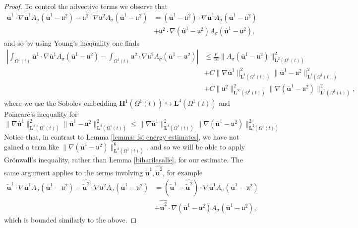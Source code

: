 \documentclass[a4paper]{amsart}
\numberwithin{equation}{section}
\newcommand{\grad}{\nabla}
\theoremstyle{plain}
\newcommand{\mbf}[1]{\mathbf{#1}}
\newcommand{\utwo}{\boldsymbol{\mathfrak{u}}^2}
\begin{document}
\begin{proof}
To control the advective terms we observe that
\begin{align*}
\overline{\mbf{u}}^1 \cdot \grad\overline{\mbf{u}}^1 A_{\sigma}(\overline{\mbf{u}}^1 - \utwo) - \utwo \cdot \grad \utwo A_{\sigma}(\overline{\mbf{u}}^1 - \utwo) &= (\overline{\mbf{u}}^1 - \utwo) \cdot \grad\overline{\mbf{u}}^1 A_{\sigma}(\overline{\mbf{u}}^1 - \utwo)\\
&+ \utwo \cdot \grad (\overline{\mbf{u}}^1 - \utwo) A_{\sigma}(\overline{\mbf{u}}^1 - \utwo),
\end{align*}
and so by using Young's inequality one finds
\begin{align*}
    \left| \int_{\Omega^1(t)} \overline{\mbf{u}}^1 \cdot \grad\overline{\mbf{u}}^1 A_{\sigma}(\overline{\mbf{u}}^1 - \utwo) -  \int_{\Omega^1(t)} \utwo \cdot \grad \utwo A_{\sigma}(\overline{\mbf{u}}^1 - \utwo)\right| &\leq \frac{\mu}{16} \|A_{\sigma}(\overline{\mbf{u}}^1 - \utwo)\|_{\mbf{L}^2(\Omega^1(t))}^2\\
    &+ C \|\grad \overline{\mbf{u}}^1\|_{\mbf{L}^4(\Omega^1(t))}^2 \|\overline{\mbf{u}}^1 - \utwo\|_{\mbf{L}^4(\Omega^1(t))}^2\\
    &+ C\|\utwo\|_{\mbf{L}^\infty(\Omega^1(t))}^2 \|\grad(\overline{\mbf{u}}^1 - \utwo)\|_{\mbf{L}^2(\Omega^1(t))}^2,
\end{align*}
where we use the Sobolev embedding $\mbf{H}^1(\Omega^1(t)) \hookrightarrow \mbf{L}^4(\Omega^1(t))$ and Poincar\'e's inequality for
\[ \|\grad \overline{\mbf{u}}^1\|_{\mbf{L}^4(\Omega^1(t))}^2 \|\overline{\mbf{u}}^1 - \utwo\|_{\mbf{L}^4(\Omega^1(t))}^2 \leq \|\grad \overline{\mbf{u}}^1\|_{\mbf{L}^4(\Omega^1(t))}^2 \|\grad(\overline{\mbf{u}}^1 - \utwo)\|_{\mbf{L}^2(\Omega^1(t))}^2 \]
Notice that, in contrast to Lemma \ref{lemma: fsi energy estimates}, we have not gained a term like $\|\grad(\overline{\mbf{u}}^1 - \utwo)\|_{\mbf{L}^2(\Omega^1(t))}^6$, and so we will be able to apply Gr\"onwall's inequality, rather than Lemma \ref{biharilasalle}, for our estimate.
The same argument applies to the terms involving $\widetilde{\mbf{u}}^1, \widehat{\widetilde{\mbf{u}}^2}$, for example
\begin{align*}
    \widetilde{\mbf{u}}^1 \cdot \grad \overline{\mbf{u}}^1 A_{\sigma}(\overline{\mbf{u}}^1 - \utwo) -\widehat{\widetilde{\mbf{u}}^2} \cdot \grad \utwo A_{\sigma}(\overline{\mbf{u}}^1 - \utwo) &= (\widetilde{\mbf{u}}^1 - \widehat{\widetilde{\mbf{u}}^2}) \cdot \grad \overline{\mbf{u}}^1 A_{\sigma}(\overline{\mbf{u}}^1 - \utwo)\\
    &+ \widehat{\widetilde{\mbf{u}}^2} \cdot \grad (\overline{\mbf{u}}^1-\utwo) A_{\sigma}(\overline{\mbf{u}}^1 - \utwo),
\end{align*}
which is bounded similarly to the above.


\end{proof}
\end{document}
